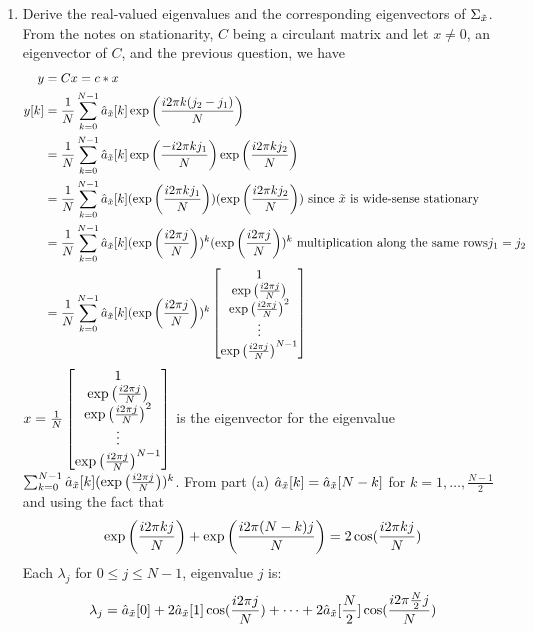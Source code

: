 \documentclass[12pt,twoside]{article}
\begin{document}
\begin{enumerate}
\begin{enumerate}
 
  \item Derive the real-valued eigenvalues and the corresponding eigenvectors of $\Sigma_{\tilde{  x }}$.\\
  From the notes on stationarity, $C$ being a circulant matrix and let $x \neq 0$, an eigenvector of $C$, and the previous question, we have
  \begin{align*}
  					y	&= C x =	c * x \\
					y[k]	&= \frac{1}{N}\sum_{k=0}^{N-1} \hat{a}_{\tilde{  x }}[k] \exp\left( \frac{i2 \pi k (j_2-j_1)}{N} \right) \\
						&=  \frac{1}{N}\sum_{k=0}^{N-1} \hat{a}_{\tilde{  x }}[k]  \exp\left( \frac{-i2 \pi k j_1}{N} \right)  \exp\left( \frac{i2 \pi k j_2}{N} \right) \\
						&= \frac{1}{N}\sum_{k=0}^{N-1} \hat{a}_{\tilde{  x }}[k] ( \exp\left( \frac{i2 \pi k j_1}{N} \right) )  (\exp\left( \frac{i2 \pi k j_2}{N} \right))  \text{ since } \tilde{  x } \text{ is wide-sense stationary}\\
						&= \frac{1}{N}\sum_{k=0}^{N-1} \hat{a}_{\tilde{  x }}[k] ( \exp\left( \frac{i2 \pi j}{N} \right) )^k    ( \exp\left( \frac{i2 \pi j}{N} \right) )^k  \text{ multiplication along the same rows} j_1 = j_2\\
						&=  \frac{1}{N}\sum_{k=0}^{N-1} \hat{a}_{\tilde{  x }}[k] ( \exp\left( \frac{i2 \pi j}{N} \right) )^k  \begin{bmatrix} 1 \\  \exp\left( \frac{i2 \pi j}{N} \right)  \\  \exp\left( \frac{i2 \pi j}{N} \right)^2 \\ \vdots \\  \exp\left( \frac{i2 \pi j}{N} \right)^{N-1} \end{bmatrix}\\
  \end{align*}
  $x= \frac{1}{N} \begin{bmatrix} 1 \\  \exp\left( \frac{i2 \pi j}{N} \right)  \\  \exp\left( \frac{i2 \pi j}{N} \right)^2 \\ \vdots \\  \exp\left( \frac{i2 \pi j}{N} \right)^{N-1} \end{bmatrix}$ is the eigenvector for the eigenvalue $\sum_{k=0}^{N-1} \hat{a}_{\tilde{  x }}[k] ( \exp\left( \frac{i2 \pi j}{N} \right) )^k $.
  From part (a)  $\hat{a}_{\tilde{  x }}[k] = \hat{a}_{\tilde{  x }}[N-k]$ for $k=1,\ldots,\frac{N-1}{2}$ and using the fact that 
  $$
  \exp\left( \frac{i2 \pi k j}{N} \right) +  \exp\left( \frac{i2 \pi (N-k) j}{N} \right) = 2 \cos (\frac{i2 \pi k j}{N})
  $$
  Each $\lambda_j$ for $0 \le j \le N-1$, eigenvalue $j$ is:
  $$
  	\lambda_j = \hat{a}_{\tilde{  x }}[0] +  2 \hat{a}_{\tilde{  x }}[1] \cos (\frac{i2 \pi j}{N})+ \cdots +   2 \hat{a}_{\tilde{  x }}[\frac{N}{2}] \cos (\frac{i2 \pi \frac{N}{2} j}{N})
  $$
  \end{enumerate}


\end{enumerate}
\end{document}
